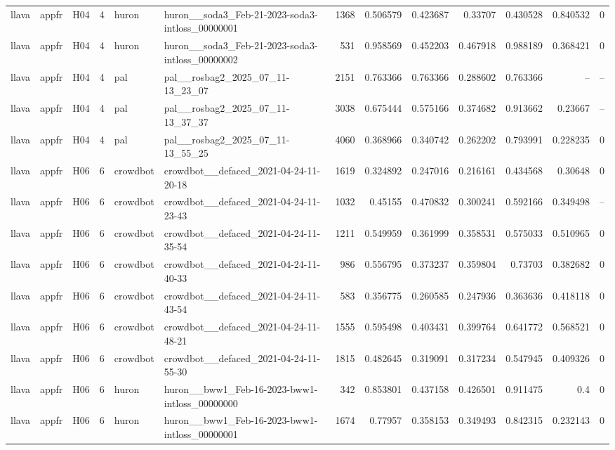 \begin{longtable}{lllrllrrrrrrr}
llava & appfr & H04 & 4 & huron & huron\_\_soda3\_Feb-21-2023-soda3-intloss\_00000001 & 1368 & 0.506579 & 0.423687 & 0.33707 & 0.430528 & 0.840532 & 0 \\
llava & appfr & H04 & 4 & huron & huron\_\_soda3\_Feb-21-2023-soda3-intloss\_00000002 & 531 & 0.958569 & 0.452203 & 0.467918 & 0.988189 & 0.368421 & 0 \\
llava & appfr & H04 & 4 & pal & pal\_\_rosbag2\_2025\_07\_11-13\_23\_07 & 2151 & 0.763366 & 0.763366 & 0.288602 & 0.763366 & -- & -- \\
llava & appfr & H04 & 4 & pal & pal\_\_rosbag2\_2025\_07\_11-13\_37\_37 & 3038 & 0.675444 & 0.575166 & 0.374682 & 0.913662 & 0.23667 & -- \\
llava & appfr & H04 & 4 & pal & pal\_\_rosbag2\_2025\_07\_11-13\_55\_25 & 4060 & 0.368966 & 0.340742 & 0.262202 & 0.793991 & 0.228235 & 0 \\
llava & appfr & H06 & 6 & crowdbot & crowdbot\_\_defaced\_2021-04-24-11-20-18 & 1619 & 0.324892 & 0.247016 & 0.216161 & 0.434568 & 0.30648 & 0 \\
llava & appfr & H06 & 6 & crowdbot & crowdbot\_\_defaced\_2021-04-24-11-23-43 & 1032 & 0.45155 & 0.470832 & 0.300241 & 0.592166 & 0.349498 & -- \\
llava & appfr & H06 & 6 & crowdbot & crowdbot\_\_defaced\_2021-04-24-11-35-54 & 1211 & 0.549959 & 0.361999 & 0.358531 & 0.575033 & 0.510965 & 0 \\
llava & appfr & H06 & 6 & crowdbot & crowdbot\_\_defaced\_2021-04-24-11-40-33 & 986 & 0.556795 & 0.373237 & 0.359804 & 0.73703 & 0.382682 & 0 \\
llava & appfr & H06 & 6 & crowdbot & crowdbot\_\_defaced\_2021-04-24-11-43-54 & 583 & 0.356775 & 0.260585 & 0.247936 & 0.363636 & 0.418118 & 0 \\
llava & appfr & H06 & 6 & crowdbot & crowdbot\_\_defaced\_2021-04-24-11-48-21 & 1555 & 0.595498 & 0.403431 & 0.399764 & 0.641772 & 0.568521 & 0 \\
llava & appfr & H06 & 6 & crowdbot & crowdbot\_\_defaced\_2021-04-24-11-55-30 & 1815 & 0.482645 & 0.319091 & 0.317234 & 0.547945 & 0.409326 & 0 \\
llava & appfr & H06 & 6 & huron & huron\_\_bww1\_Feb-16-2023-bww1-intloss\_00000000 & 342 & 0.853801 & 0.437158 & 0.426501 & 0.911475 & 0.4 & 0 \\
llava & appfr & H06 & 6 & huron & huron\_\_bww1\_Feb-16-2023-bww1-intloss\_00000001 & 1674 & 0.77957 & 0.358153 & 0.349493 & 0.842315 & 0.232143 & 0 \\

\end{longtable}
